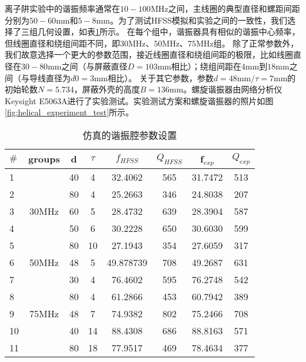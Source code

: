 离子阱实验中的谐振频率通常在$10-100$MHz之间，主线圈的典型直径和螺距间距分别为$50-60 $mm和$5-8$mm。为了测试HFSS模拟和实验之间的一致性，我们选择了三组几何设置，如表\ref{tb:helical_simulation_parameters}所示。
在每个组中，谐振器具有相似的谐振中心频率，但线圈直径和绕组间距不同，即$30$MHz、$50$MHz、$75$MHz组。
除了正常参数外，我们故意选择一个更大的参数范围，接近线圈直径和绕组间距的极限，比如线圈直径在$30-80$mm之间（与屏蔽直径$D=103$mm相比）；绕组间距在$4$mm到$ 18$mm之间（与导线直径为$d0 = 3$mm相比）。
关于其它参数，参数$d=48$mm$/\tau = 7$mm的初始轮数$N = 5.734$，屏蔽外壳的高度$ B = 136$mm。螺旋谐振器由网络分析仪Keysight E5063A进行了实验测试。实验测试方案和螺旋谐振器的照片如图\ref{fig:helical_experiment_test}所示。
\begin{table}
    \centering
    \caption[仿真的谐振腔参数设置]{仿真的谐振腔参数设置\label{tb:helical_simulation_parameters}}
    \begin{tabular}{lccccccc}
        \toprule
        $\#$ & groups & d & $\tau$ & $f_{HFSS}$ & $Q_{HFSS}$ & f$_{exp}$ & $Q_{exp}$ \\
        \midrule

        1 & \multirow{5}{*}{30MHz} 	& 40 & 4  & 32.4062 & 565 & 31.7472 & 513   \\
        2 & 						& 80 & 4  & 25.2663 & 346 & 24.8038 & 207   \\
        3 & 						& 60 & 5  & 28.4732 & 639 & 28.3904 & 587   \\
        4 & 						& 50 & 6  & 30.2228 & 650 & 30.6030 & 599   \\
        5 & 						& 80 & 10 & 27.1943 & 354 & 27.6059 & 317   \\
        \midrule
        6 & 50MHz 					& 48 & 5  & 49.878739 & 708 & 49.2687 & 631   \\
        \midrule
        7 & \multirow{5}{*}{75MHz} 	& 30 & 4  & 76.4602 & 595 & 76.2748 & 542   \\
        8 & 						& 80 & 4  & 61.2866 & 453 & 60.7942 & 389   \\
        9 & 						& 48 & 7  & 74.9382 & 802 & 75.2466 & 708   \\
        10 & 						& 40 & 14 & 88.4308 & 686 & 88.8163 & 571   \\
        11 & 						& 80 & 18 & 77.9517 & 469 & 78.4634 & 377   \\
        \bottomrule
    \end{tabular}
\end{table}


